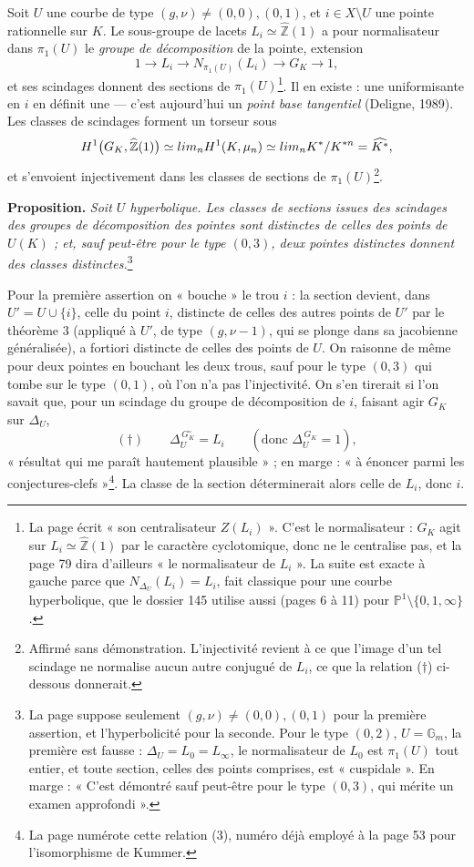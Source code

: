 \documentclass[11pt,a4paper]{article}
\begin{document}
Soit $U$ une courbe de type $(g, \nu) \ne (0,0), (0,1)$, et $i \in X
\setminus U$ une pointe rationnelle sur $K$. Le sous-groupe de lacets $L_i
\simeq \widehat{\mathbb{Z}}(1)$ a pour normalisateur dans $\pi_1(U)$ le
\emph{groupe de décomposition} de la pointe, extension
\[
1 \longrightarrow L_i \longrightarrow N_{\pi_1(U)}(L_i) \longrightarrow G_K
\longrightarrow 1 ,
\]
et ses scindages donnent des sections de $\pi_1(U)$\footnote{La page écrit
« son centralisateur $Z(L_i)$ ». C'est le normalisateur : $G_K$ agit sur $L_i
\simeq \widehat{\mathbb{Z}}(1)$ par le caractère cyclotomique, donc ne le
centralise pas, et la page 79 dira d'ailleurs « le normalisateur de $L_i$ ». La
suite est exacte à gauche parce que $N_{\Delta_U}(L_i) = L_i$, fait classique
pour une courbe hyperbolique, que le dossier 145 utilise aussi (pages 6 à 11)
pour $\mathbb{P}^1 \setminus \{0,1,\infty\}$.}. Il en existe : une
uniformisante en $i$ en définit une — c'est aujourd'hui un \emph{point base
tangentiel} (Deligne, 1989). Les classes de scindages forment un torseur sous
\[
H^1\bigl(G_K, \widehat{\mathbb{Z}}(1)\bigr) \simeq \varprojlim_n H^1(K, \mu_n)
\simeq \varprojlim_n K^{*}/K^{*n} = \widehat{K^{*}},
\]
et s'envoient injectivement dans les classes de sections de
$\pi_1(U)$\footnote{Affirmé sans démonstration. L'injectivité revient à ce que
l'image d'un tel scindage ne normalise aucun autre conjugué de $L_i$, ce que
la relation ($\dagger$) ci-dessous donnerait.}.

\textbf{Proposition.} \emph{Soit $U$ hyperbolique. Les classes de sections
issues des scindages des groupes de décomposition des pointes sont distinctes
de celles des points de $U(K)$ ; et, sauf peut-être pour le type $(0,3)$,
deux pointes distinctes donnent des classes distinctes.}\footnote{La page
suppose seulement $(g, \nu) \ne (0,0), (0,1)$ pour la première assertion, et
l'hyperbolicité pour la seconde. Pour le type $(0,2)$, $U = \mathbb{G}_m$, la
première est fausse : $\Delta_U = L_0 = L_\infty$, le normalisateur de $L_0$
est $\pi_1(U)$ tout entier, et toute section, celles des points comprises, est
« cuspidale ». En marge : « C'est démontré sauf peut-être pour le type $(0,3)$,
qui mérite un examen approfondi ».}

Pour la première assertion on « bouche » le trou $i$ : la section devient,
dans $U' = U \cup \{i\}$, celle du point $i$, distincte de celles des autres
points de $U'$ par le théorème 3 (appliqué à $U'$, de type $(g, \nu - 1)$, qui
se plonge dans sa jacobienne généralisée), a fortiori distincte de celles des
points de $U$. On raisonne de même pour deux pointes en bouchant les deux
trous, sauf pour le type $(0,3)$ qui tombe sur le type $(0,1)$, où l'on n'a pas
l'injectivité. On s'en tirerait si l'on savait que, pour un scindage du groupe
de décomposition de $i$, faisant agir $G_K$ sur $\Delta_U$,
\[
(\dagger)\qquad \Delta_U^{\,G_K^{\circ}} = L_i \qquad (\text{donc }
\Delta_U^{\,G_K} = 1),
\]
« résultat qui me paraît hautement plausible » ; en marge : « à énoncer parmi
les conjectures-clefs »\footnote{La page numérote cette relation (3), numéro
déjà employé à la page 53 pour l'isomorphisme de Kummer.}. La classe de la
section déterminerait alors celle de $L_i$, donc $i$.
\end{document}
